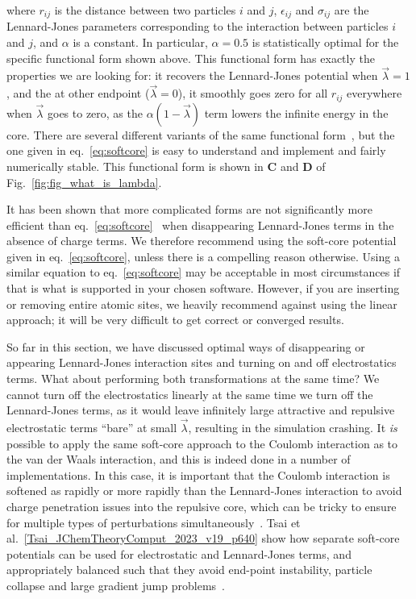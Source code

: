 \documentclass[9pt,bestpractices]{livecoms}
\begin{document}
where $r_{ij}$ is the distance between two particles $i$ and $j$, $\epsilon_{ij}$ and $\sigma_{ij}$ are the Lennard-Jones parameters corresponding to the interaction between particles $i$ and $j$, and $\alpha$ is a constant. In particular, $\alpha=0.5$ is statistically optimal for the specific functional form shown above. This functional form has exactly the properties we are looking for: it recovers the Lennard-Jones potential when $\vec{\lambda}=1$, and the at other endpoint ($\vec{\lambda}=0$), it smoothly goes zero for all $r_{ij}$ everywhere when $\vec{\lambda}$ goes to zero, as the $\alpha(1-\vec{\lambda})$ term lowers the infinite energy in the core. There are several different variants of the same functional form~\cite{zacharias1994separationshifted, beutler1994avoiding,pham2011identifying,Lee_JChemTheoryComput_2020_v16_p5512,Tsai_JChemTheoryComput_2023_v19_p640}, but the one given in eq.~\ref{eq:softcore} is easy to understand and implement and fairly numerically stable. This functional form is shown in \textbf{C} and \textbf{D} of Fig.~\ref{fig:fig_what_is_lambda}.

It has been shown that more complicated forms are not significantly more efficient than eq.~\ref{eq:softcore}~\cite{pham2012optimal} when disappearing Lennard-Jones terms in the absence of charge terms. We therefore recommend using the soft-core potential given in eq.~\ref{eq:softcore}, unless there is a compelling reason otherwise. Using a similar equation to eq.~\ref{eq:softcore} may be acceptable in most circumstances if that is what is supported in your chosen software. However, if you are inserting or removing entire atomic sites, we heavily recommend against using the linear approach; it will be very difficult to get correct or converged results. 


So far in this section, we have discussed optimal ways of disappearing or appearing Lennard-Jones interaction sites and turning on and off electrostatics terms. What about performing both transformations at the same time? We cannot turn off the electrostatics linearly at the same time we turn off the Lennard-Jones terms, as it would leave infinitely large attractive and repulsive electrostatic terms ``bare'' at small $\vec{\lambda}$, resulting in the simulation crashing. It \textit{is} possible to apply the same soft-core approach to the Coulomb interaction as to the van der Waals interaction, and this is indeed done in a number of implementations. In this case, it is important that the Coulomb interaction is softened as rapidly or more rapidly than the Lennard-Jones interaction to avoid charge penetration issues into the repulsive core, which  can be tricky to ensure for multiple types of perturbations simultaneously~\cite{steinbrecher2011softcore}. Tsai et al.~\ref{Tsai_JChemTheoryComput_2023_v19_p640} show how separate soft-core potentials can be used for electrostatic and Lennard-Jones terms, and appropriately balanced such that they avoid end-point instability, particle collapse and large gradient jump problems~\cite{Tsai_JChemTheoryComput_2023_v19_p640}.
\end{document}
